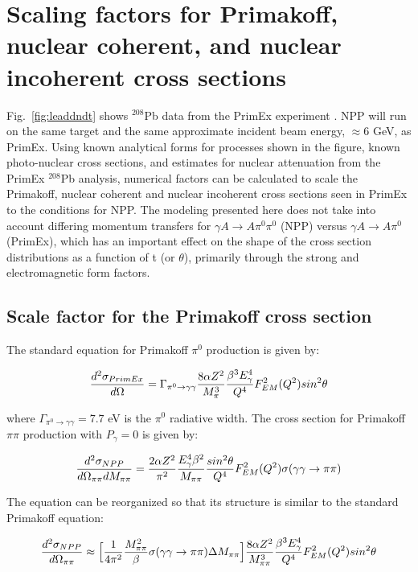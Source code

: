 \section{Scaling factors for Primakoff, nuclear coherent, and nuclear incoherent cross sections  \label{sec:SigmaScaling}}
Fig.~\ref{fig:leaddndt} shows $^{208}$Pb data from the PrimEx experiment \cite{Larin:2010kq}.   NPP will run on the same target and the same approximate incident beam energy, $\approx 6$ GeV, as PrimEx.   Using known analytical forms for processes shown in the figure, known photo-nuclear cross sections, and estimates for nuclear attenuation from the PrimEx $^{208}$Pb analysis, numerical factors can be calculated  to scale the Primakoff, nuclear coherent and nuclear incoherent cross sections seen in PrimEx to the conditions for NPP. 
The modeling presented here does not take into account differing momentum transfers for $\gamma A \rightarrow A \pi^0 \pi^0$ (NPP) versus  $\gamma A \rightarrow A \pi^0 $ (PrimEx), which  has an important effect on the shape of the cross section distributions as a function of t (or $\theta$), primarily through the strong and electromagnetic form factors.    

 \subsection{Scale factor for the Primakoff cross section}
The standard equation for Primakoff $\pi^0$ production is given by: 

$$ { d^2 \sigma_{PrimEx} \over d \Omega } = \Gamma_{\pi^0 \rightarrow \gamma \gamma} { 8 \alpha Z^2 \over M^3_{\pi} }
{ \beta^3 E_\gamma^4 \over Q^4 } F^2_{EM}(Q^2) sin^2 \theta   $$ 

where $\Gamma_{\pi^0 \rightarrow \gamma \gamma} = 7.7$ eV is the $\pi^0$ radiative width.  The cross section for Primakoff $\pi \pi$ production with $P_{\gamma}=0$ is given by: 

$$ {d^2 \sigma_{NPP} \over d \Omega_{\pi \pi} dM_{\pi \pi} } = {2 \alpha Z^2 \over \pi^2} 
{E_\gamma^4 \beta^2 \over M_{\pi \pi} } {sin^2 \theta \over Q^4 } F^2_{EM}(Q^2) 
 \sigma( \gamma \gamma \rightarrow \pi \pi) $$

The equation can be reorganized so that its structure is similar to the standard Primakoff equation: 

$$ {d^2 \sigma_{NPP} \over d \Omega_{\pi \pi} } \approx
\Big[ {1 \over 4 \pi^2 }  {M^2_{\pi \pi} \over \beta }  \sigma( \gamma \gamma \rightarrow \pi \pi) \Delta M_{\pi \pi} \Big]  { 8 \alpha Z^2 \over M^3_{\pi \pi} }
{ \beta^3 E_\gamma^4 \over Q^4 } F^2_{EM}(Q^2) sin^2 \theta  $$

